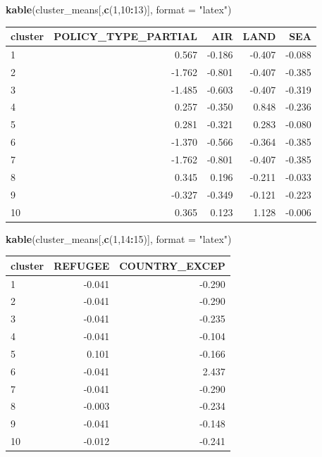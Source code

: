 \documentclass[]{article}
\newenvironment{Shaded}{\begin{snugshade}}{\end{snugshade}}
\newcommand{\DataTypeTok}[1]{\textcolor[rgb]{0.13,0.29,0.53}{#1}}
\newcommand{\DecValTok}[1]{\textcolor[rgb]{0.00,0.00,0.81}{#1}}
\newcommand{\KeywordTok}[1]{\textcolor[rgb]{0.13,0.29,0.53}{\textbf{#1}}}
\newcommand{\NormalTok}[1]{#1}
\newcommand{\OperatorTok}[1]{\textcolor[rgb]{0.81,0.36,0.00}{\textbf{#1}}}
\newcommand{\StringTok}[1]{\textcolor[rgb]{0.31,0.60,0.02}{#1}}
\begin{document}
\begin{Shaded}
\begin{Highlighting}[]
\KeywordTok{kable}\NormalTok{(cluster_means[,}\KeywordTok{c}\NormalTok{(}\DecValTok{1}\NormalTok{,}\DecValTok{10}\OperatorTok{:}\DecValTok{13}\NormalTok{)], }\DataTypeTok{format =} \StringTok{"latex"}\NormalTok{)}
\end{Highlighting}
\end{Shaded}

\begin{tabular}{l|r|r|r|r}
\hline
cluster & POLICY\_TYPE\_PARTIAL & AIR & LAND & SEA\\
\hline
1 & 0.567 & -0.186 & -0.407 & -0.088\\
\hline
2 & -1.762 & -0.801 & -0.407 & -0.385\\
\hline
3 & -1.485 & -0.603 & -0.407 & -0.319\\
\hline
4 & 0.257 & -0.350 & 0.848 & -0.236\\
\hline
5 & 0.281 & -0.321 & 0.283 & -0.080\\
\hline
6 & -1.370 & -0.566 & -0.364 & -0.385\\
\hline
7 & -1.762 & -0.801 & -0.407 & -0.385\\
\hline
8 & 0.345 & 0.196 & -0.211 & -0.033\\
\hline
9 & -0.327 & -0.349 & -0.121 & -0.223\\
\hline
10 & 0.365 & 0.123 & 1.128 & -0.006\\
\hline
\end{tabular}

\begin{Shaded}
\begin{Highlighting}[]
\KeywordTok{kable}\NormalTok{(cluster_means[,}\KeywordTok{c}\NormalTok{(}\DecValTok{1}\NormalTok{,}\DecValTok{14}\OperatorTok{:}\DecValTok{15}\NormalTok{)], }\DataTypeTok{format =} \StringTok{"latex"}\NormalTok{)}
\end{Highlighting}
\end{Shaded}

\begin{tabular}{l|r|r}
\hline
cluster & REFUGEE & COUNTRY\_EXCEP\\
\hline
1 & -0.041 & -0.290\\
\hline
2 & -0.041 & -0.290\\
\hline
3 & -0.041 & -0.235\\
\hline
4 & -0.041 & -0.104\\
\hline
5 & 0.101 & -0.166\\
\hline
6 & -0.041 & 2.437\\
\hline
7 & -0.041 & -0.290\\
\hline
8 & -0.003 & -0.234\\
\hline
9 & -0.041 & -0.148\\
\hline
10 & -0.012 & -0.241\\
\hline
\end{tabular}
\end{document}
